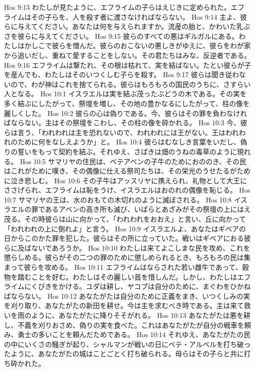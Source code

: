 Hos 9:13  わたしが見たように、エフライムの子らはえじきに定められた。エフライムはその子らを、人を殺す者に渡さなければならない。
Hos 9:14  主よ、彼らに与えてください。あなたは何を与えられますか。流産の胎と、かわいた乳ぶさを彼らに与えてください。
Hos 9:15  彼らのすべての悪はギルガルにある。わたしはかしこで彼らを憎んだ。彼らのおこないの悪しきがゆえに、彼らをわが家から追いだし、重ねて愛することをしない。その君たちはみな、反逆者である。
Hos 9:16  エフライムは撃たれ、その根は枯れて、実を結ばない。たとい彼らが子を産んでも、わたしはそのいつくしむ子らを殺す。
Hos 9:17  彼らは聞き従わないので、わが神はこれを捨てられる。彼らはもろもろの国民のうちに、さすらい人となる。
Hos 10:1  イスラエルは実を結ぶ茂ったぶどうの木である。その実を多く結ぶにしたがって、祭壇を増し、その地の豊かなるにしたがって、柱の像を麗しくした。
Hos 10:2  彼らの心は偽りである。今、彼らはその罪を負わなければならない。主はその祭壇をこわし、その柱の像を砕かれる。
Hos 10:3  今、彼らは言う、「われわれは主を恐れないので、われわれには王がない。王はわれわれのために何をなしえようか」と。
Hos 10:4  彼らはむなしき言葉をいだし、偽りの誓いをもって契約を結ぶ。それゆえ、さばきは畑のうねの毒草のように現れる。
Hos 10:5  サマリヤの住民は、ベテアベンの子牛のためにおののき、その民はこれがために嘆き、その偶像に仕える祭司たちは、その栄光のうせたるがために泣き悲しむ。
Hos 10:6  その子牛はアッスリヤに携えられ、礼物として大王にささげられ、エフライムは恥をうけ、イスラエルはおのれの偶像を恥じる。
Hos 10:7  サマリヤの王は、水のおもての木切れのように滅ぼされる。
Hos 10:8  イスラエルの罪であるアベンの高き所も滅び、いばらとあざみがその祭壇の上にはえ茂る。その時彼らは山に向かって、「われわれをおおえ」と言い、丘に向かって「われわれの上に倒れよ」と言う。
Hos 10:9  イスラエルよ、あなたはギベアの日からこのかた罪を犯した。彼らはその所に立っていた。戦いはギベアにおる彼らに及ばないであろうか。
Hos 10:10  わたしは来てよこしまな民を攻め、これを懲らしめる。彼らがその二つの罪のために懲しめられるとき、もろもろの民は集まって彼らを攻める。
Hos 10:11  エフライムはならされた若い雌牛であって、穀物を踏むことを好む。わたしはその麗しい首を惜しんだ。しかし、わたしはエフライムにくびきをかける。ユダは耕し、ヤコブは自分のために、まぐわをひかねばならない。
Hos 10:12  あなたがたは自分のために正義をまき、いつくしみの実を刈り取り、あなたがたの新田を耕せ。今は主を求むべき時である。主は来て救いを雨のように、あなたがたに降りそそがれる。
Hos 10:13  あなたがたは悪を耕し、不義を刈りおさめ、偽りの実を食べた。これはあなたがたが自分の戦車を頼み、勇士の多いことを頼んだためである。
Hos 10:14  それゆえ、あなたがたの民の中にいくさの騒ぎが起り、シャルマンが戦いの日にベテ・アルベルを打ち破ったように、あなたがたの城はことごとく打ち破られる。母らはその子らと共に打ち砕かれた。
